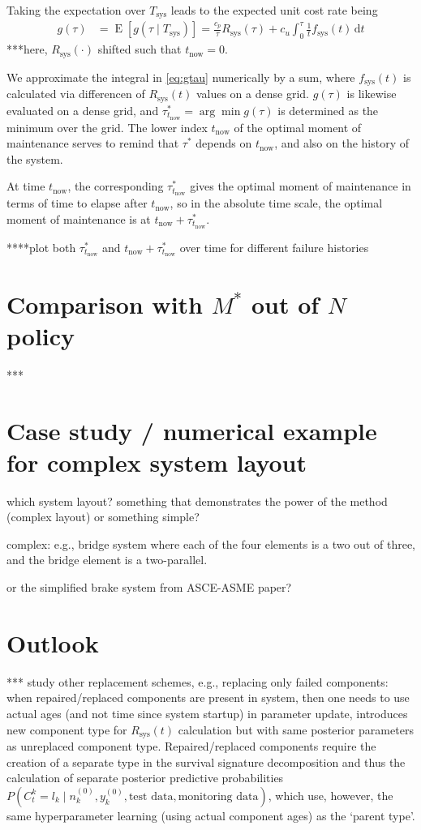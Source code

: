 \documentclass[authoryear]{elsarticle}
\newcommand{\dd}{\,\mathrm{d}}
\newcommand{\uz}{^{(0)}} %
\newcommand{\Tsys}{T_\text{sys}}
\newcommand{\Rsys}{R_\text{sys}}
\newcommand{\fsys}{f_\text{sys}}
\newcommand{\E}{\operatorname{E}}
\def\ykz{y\uz_k}
\def\nkz{n\uz_k}
\def\tnow{t_\text{now}}
\begin{document}
Taking the expectation over $\Tsys$ leads to the expected unit cost rate being
\begin{align}
g(\tau) &= \E[g(\tau \mid \Tsys)] = \frac{c_p}{\tau} \Rsys(\tau) + c_u \int_0^\tau \frac{1}{t} \fsys(t) \dd t
\label{eq:gtau}
\end{align}
***here, $\Rsys(\cdot)$ shifted such that $\tnow = 0$.

We approximate the integral in \eqref{eq:gtau} numerically by a sum,
where $\fsys(t)$ is calculated via differencen of $\Rsys(t)$ values on a dense grid.
$g(\tau)$ is likewise evaluated on a dense grid,
and $\tau^*_{\tnow} = \arg\min g(\tau)$ is determined as the minimum over the grid.
The lower index $\tnow$ of the optimal moment of maintenance serves to remind that
$\tau^*$ depends on $\tnow$, and also on the history of the system.

At time $\tnow$, the corresponding $\tau^*_{\tnow}$ gives the optimal moment of maintenance in terms of time to elapse after $\tnow$,
so in the absolute time scale, the optimal moment of maintenance is at $\tnow + \tau^*_{\tnow}$.

****plot both $\tau^*_{\tnow}$ and $\tnow + \tau^*_{\tnow}$ over time for different failure histories


\section{Comparison with $M^*$ out of $N$ policy}

***


\section{Case study / numerical example for complex system layout}

which system layout? something that demonstrates the power of the method (complex layout) or something simple?

complex: e.g., bridge system where each of the four elements is a two out of three, and the bridge element is a two-parallel.

or the simplified brake system from ASCE-ASME paper?


\section{Outlook}

*** study other replacement schemes, e.g., replacing only failed components:
when repaired/replaced components are present in system,
then one needs to use actual ages (and not time since system startup) in parameter update,
introduces new component type for $\Rsys(t)$ calculation but with same posterior parameters as unreplaced component type.
Repaired/replaced components require the creation of a separate type in the survival signature decomposition
and thus the calculation of separate posterior predictive probabilities
$P(C^k_t = l_k \mid \nkz,\ykz,\text{test data},\text{monitoring data})$,
which use, however, the same hyperparameter learning (using actual component ages) as the `parent type'.
\end{document}
